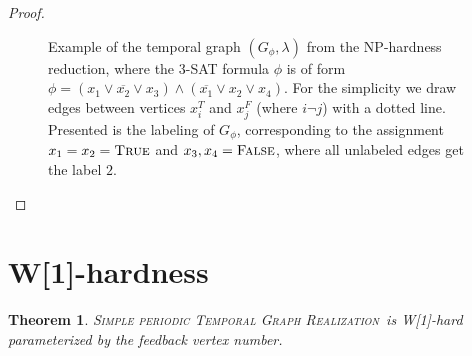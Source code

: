 \documentclass[11pt,a4paper]{article}
\newtheorem{theorem}{Theorem}
\theoremstyle{remark}
\theoremstyle{definition}
\newcommand{\deltaExactLong}{\textsc{Simple periodic Temporal Graph Realization}}
\begin{document}
\begin{proof}
\begin{figure}[h]
{
}
\caption{Example of the temporal graph $(G_\phi,\lambda)$ from the NP-hardness reduction, 
	where the 3-SAT formula $\phi$ is of form $\phi = (x_1 \vee \overline{x_2} \vee x_3) \wedge (\overline{x_1} \vee x_2 \vee x_4)$.
For the simplicity we draw edges between vertices $x_i^T$ and $x_j^F$ (where $i \neg j$) with a dotted line.
Presented is the labeling of $G_\phi$, corresponding to the assignment $x_1=x_2=\textsc{True}$ and $x_3,x_4=\textsc{False}$,
where all unlabeled edges get the label $2$.}
\end{figure}
\end{proof}


\section{W[1]-hardness}
\begin{theorem}\label{thm:W1wrtFVS}
    \deltaExactLong\ is W[1]-hard parameterized by the feedback vertex number.
\end{theorem}
\end{document}

